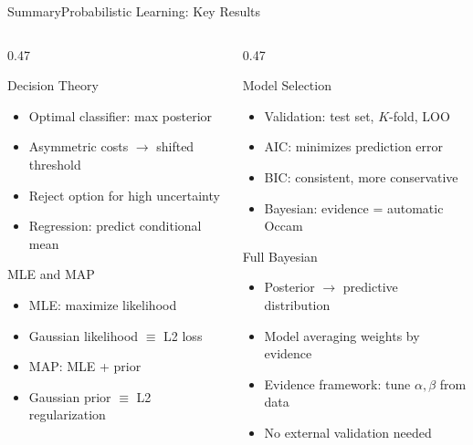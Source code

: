 \begin{frame}{Summary}{Probabilistic Learning: Key Results}
  \begin{columns}
    \begin{column}{0.47\textwidth}
      \begin{block}{Decision Theory}
        \begin{itemize}
          \item Optimal classifier: max posterior
          \item Asymmetric costs $\to$ shifted threshold
          \item Reject option for high uncertainty
          \item Regression: predict conditional mean
        \end{itemize}
      \end{block}

      \begin{block}{MLE and MAP}
        \begin{itemize}
          \item MLE: maximize likelihood
          \item Gaussian likelihood $\equiv$ L2 loss
          \item MAP: MLE + prior
          \item Gaussian prior $\equiv$ L2 regularization
        \end{itemize}
      \end{block}
    \end{column}
    \begin{column}{0.47\textwidth}
      \begin{block}{Model Selection}
        \begin{itemize}
          \item Validation: test set, $K$-fold, LOO
          \item AIC: minimizes prediction error
          \item BIC: consistent, more conservative
          \item Bayesian: evidence = automatic Occam
        \end{itemize}
      \end{block}

      \begin{block}{Full Bayesian}
        \begin{itemize}
          \item Posterior $\to$ predictive distribution
          \item Model averaging weights by evidence
          \item Evidence framework: tune $\alpha, \beta$ from data
          \item No external validation needed
        \end{itemize}
      \end{block}
    \end{column}
  \end{columns}
\end{frame}

